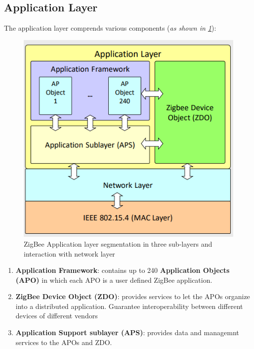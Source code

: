 \documentclass[10pt,a4paper]{report}
\theoremstyle{definition}
\begin{document}
\subsection{Application Layer}\label{sec:application-layer}
The application layer comprends various components (\textit{as shown in \ref{zigbee-app-layer}}):
\begin{figure}[h!]
	\centering\includegraphics[scale=0.50]{images/Pasted image 20230311122809.png}
	\caption{ZigBee Application layer segmentation in three sub-layers and interaction with network layer}
	\label{zigbee-app-layer}
\end{figure}

\begin{enumerate}
	\item 
	\textbf{Application Framework}: contains up to 240 \textbf{Application Objects (APO)} in which each APO is a user defined ZigBee application.
	\item 
	\textbf{ZigBee Device Object (ZDO)}: provides services to let the APOs organize into a distributed application. Guarantee interoperability between different devices of different vendors
	\item 
	\textbf{Application Support sublayer (APS)}: provides data and managemnt services to the APOs and ZDO.
\end{enumerate}
\end{document}
